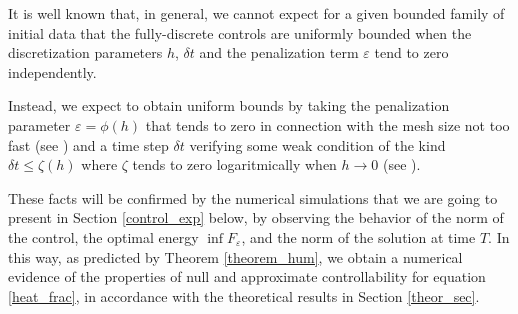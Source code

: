 It is well known that, in general, we cannot expect for a given bounded family of initial data that the fully-discrete controls are uniformly bounded when the discretization parameters $h$, $\delta t$ and the penalization term $\varepsilon$ tend to zero independently. 

Instead, we expect to obtain uniform bounds by taking the penalization parameter $\varepsilon=\phi(h)$ that tends to zero in connection with the mesh size not too fast (see \cite{boyer2013penalised}) and a time step $\delta t$ verifying some weak condition of the kind $\delta t\leq \zeta(h)$ where $\zeta$ tends to zero logaritmically when $h\to 0$ (see \cite{boyer2011uniform}).

These facts will be confirmed by the numerical simulations that we are going to present in Section \ref{control_exp} below, by observing the behavior of the norm of the control, the optimal energy $\inf F_\varepsilon$, and the norm of the solution at time $T$. In this way, as predicted by Theorem \ref{theorem_hum}, we obtain a numerical evidence of the properties of null and approximate controllability for equation \eqref{heat_frac}, in accordance with the theoretical results in Section \ref{theor_sec}. 
